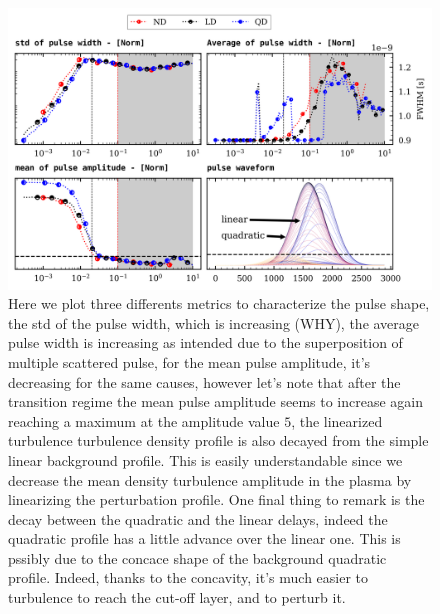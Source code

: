 \documentclass[11pt,a4paper]{report}
\begin{document}
\begin{figure}[H]
    \centering
    \includegraphics[width=1\linewidth]{./figures/pulse_params.png} %
    \caption{Here we plot three differents metrics to characterize the pulse shape, the std of the pulse width, which is increasing (WHY), the average pulse width is increasing as intended due to the superposition of multiple scattered pulse, for the mean pulse amplitude, it's decreasing for the same causes, however let's note that after the transition regime the mean pulse amplitude seems to increase again reaching a maximum at the amplitude value $5$, the linearized turbulence turbulence density profile is also decayed from the simple linear background profile. This is easily understandable since we decrease the mean density turbulence amplitude in the plasma by linearizing the perturbation profile.
        One final thing to remark is the decay between the quadratic and the linear delays, indeed the quadratic profile has a little advance over the linear one. This is pssibly due to the concace shape of the background quadratic profile. Indeed, thanks to the concavity, it's much easier to turbulence to reach the cut-off layer, and to perturb it.}
    \label{}
\end{figure}
\end{document}

